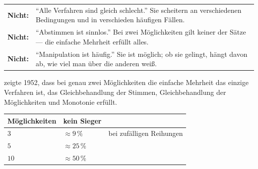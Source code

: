 \begin{warnung}
\begin{center}
{\small
\renewcommand{\arraystretch}{1.52}
\begin{tabular}{@{}P{2.4cm}P{6.2cm}@{}}
\toprule
\textbf{Nicht:} & \enquote{Alle Verfahren sind gleich schlecht.} Sie scheitern an verschiedenen Bedingungen und in verschieden häufigen Fällen.\\
\textbf{Nicht:} & \enquote{Abstimmen ist sinnlos.} Bei zwei Möglichkeiten gilt keiner der Sätze --- die einfache Mehrheit erfüllt alles.\\
\textbf{Nicht:} & \enquote{Manipulation ist häufig.} Sie ist möglich; ob sie gelingt, hängt davon ab, wie viel man über die anderen weiß.\\
\bottomrule
\end{tabular}}
\end{center}

 zeigte 1952, dass bei genau zwei Möglichkeiten die einfache Mehrheit das einzige Verfahren ist, das Gleichbehandlung der Stimmen, Gleichbehandlung der Möglichkeiten und Monotonie erfüllt.

\begin{center}
\begin{minipage}{0.88\textwidth}
\end{minipage}
\end{center}

\begin{center}
{\small
\renewcommand{\arraystretch}{1.48}
\begin{tabular}{@{}P{2.6cm}P{2.2cm}P{3.0cm}@{}}
\toprule
\textbf{Möglich\-keiten} & \textbf{kein Sieger} & \\
\midrule
$3$ & $\approx 9\,\%$ & bei zufälligen Reihungen\\
$5$ & $\approx 25\,\%$ & \\
$10$ & $\approx 50\,\%$ & \\
\bottomrule
\end{tabular}}
\end{center}

\begin{center}
\begin{minipage}{0.88\textwidth}
\end{minipage}
\end{center}
\end{warnung}


